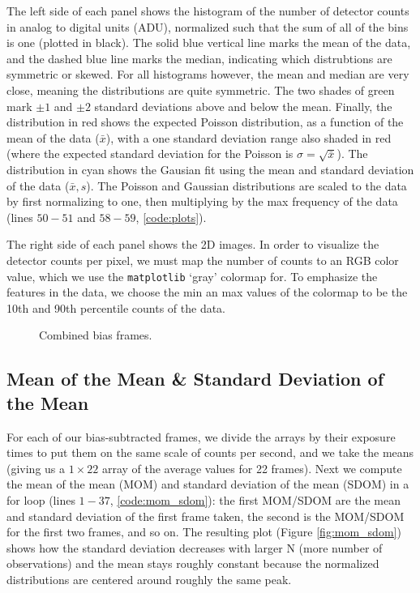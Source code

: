 \documentclass[preprint]{aastex62}
\begin{document}
The left side of each panel shows the histogram of the number of detector counts in analog to digital units (ADU), normalized such that the sum of all of the bins is one (plotted in black). The solid blue vertical line marks the mean of the data, and the dashed blue line marks the median, indicating which distrubtions are symmetric or skewed. For all histograms however, the mean and median are very close, meaning the distributions are quite symmetric. The two shades of green mark $\pm1$ and $\pm2$ standard deviations above and below the mean. Finally, the distribution in red shows the expected Poisson distribution, as a function of the mean of the data ($\bar{x}$), with a one standard deviation range also shaded in red (where the expected standard deviation for the Poisson is $\sigma=\sqrt{\bar{x}}$). The distribution in cyan shows the Gausian fit using the mean and standard deviation of the data ($\bar{x}, s$). The Poisson and Gaussian distributions are scaled to the data by first normalizing to one, then multiplying by the max frequency of the data (lines $50-51$ and $58-59$, \ref{code:plots}).

The right side of each panel shows the 2D images. In order to visualize the detector counts per pixel, we must map the number of counts to an RGB color value, which we use the {\tt matplotlib} `gray' colormap for. To emphasize the features in the data, we choose the min an max values of the colormap to be the 10th and 90th percentile counts of the data.

\begin{figure}[H]
\caption{Combined bias frames.} \label{fig:bias}
\end{figure}

\subsection{Mean of the Mean \& Standard Deviation of the Mean}
For each of our bias-subtracted frames, we divide the arrays by their exposure times to put them on the same scale of counts per second, and we take the means (giving us a $1\times22$ array of the average values for 22 frames). Next we compute the mean of the mean (MOM) and standard deviation of the mean (SDOM) in a for loop (lines $1-37$, \ref{code:mom_sdom}): the first MOM/SDOM are the mean and standard deviation of the first frame taken, the second is the MOM/SDOM for the first two frames, and so on. The resulting plot (Figure \ref{fig:mom_sdom}) shows how the standard deviation decreases with larger N (more number of observations) and the mean stays roughly constant because the normalized distributions are centered around roughly the same peak.
\end{document}
